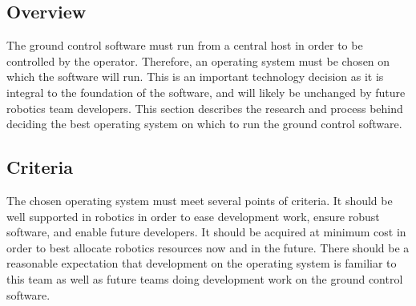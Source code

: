 \documentclass[onecolumn, draftclsnofoot, 10pt, compsoc]{IEEEtran}
\begin{document}
\subsection{Overview}
The ground control software must run from a central host in order to be controlled by the operator.
Therefore, an operating system must be chosen on which the software will run.
This is an important technology decision as it is integral to the foundation of the software, and will likely be unchanged by future robotics team developers.
This section describes the research and process behind deciding the best operating system on which to run the ground control software.

\subsection{Criteria}
The chosen operating system must meet several points of criteria.
It should be well supported in robotics in order to ease development work, ensure robust software, and enable future developers.
It should be acquired at minimum cost in order to best allocate robotics resources now and in the future.
There should be a reasonable expectation that development on the operating system is familiar to this team as well as future teams doing development work on the ground control software.
\end{document}
